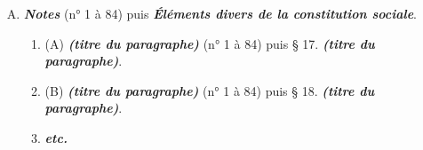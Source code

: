 \begin{enumerate}[A.]
\begin{enumerate}[I.]
        \item (\textbf{\textit{Budget domestique annuel}}\footnote{Cette section ne possède un titre que dans huit monographies}).
        \begin{enumerate}[]
            \item \textit{§ 14. Budget des recettes de l'année.}
            \item \textit{§ 15. Budget des dépenses de l'année.}
            \item \textit{Comptes annexés aux budgets} \footnotesize{(n° 1 à 84) puis} \textit{§ 16. Comptes annexés aux budgets.}
        \end{enumerate}
    \end{enumerate}
    \item \textbf{\textit{Notes}} \footnotesize{(n° 1 à 84) puis} \textbf{\textit{Éléments divers de la constitution sociale}}.
    \begin{enumerate}[]
            \item (A) \textbf{\textit{(titre du paragraphe)}} \footnotesize{(n° 1 à 84) puis} § 17. \textbf{\textit{(titre du paragraphe)}}.
            \item (B) \textbf{\textit{(titre du paragraphe)}} \footnotesize{(n° 1 à 84) puis} § 18. \textbf{\textit{(titre du paragraphe)}}.
            \item \textbf{\textit{etc.}}
        \end{enumerate}
\end{enumerate}